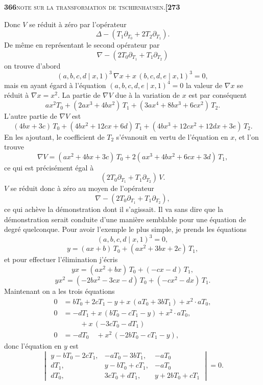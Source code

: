 \documentclass[11pt]{article}
\newcommand{\Cdel}{\mid}
\begin{document}
\newpage
\noindent\textbf{366}\hfill\textsc{note sur la transformation de tschirnhausen.}\hfill\textbf{[273}

\medskip

\noindent Donc $V$ se r\'eduit \`a z\'ero par l'op\'erateur
\[
\Delta - (T_1 \partial_{T_0} + 2 T_2 \partial_{T_1}).
\]
De m\^eme en repr\'esentant le second op\'erateur par
\[
\nabla - (2 T_0 \partial_{T_1} + T_1 \partial_{T_2})
\]
on trouve d'abord
\[
(a, b, c, d \Cdel x, 1)^3\, \nabla x + x\,(b, c, d, e \Cdel x, 1)^3 = 0,
\]
mais en ayant \'egard \`a l'\'equation $(a, b, c, d, e \Cdel x, 1)^4 = 0$ la valeur de $\nabla x$ se r\'eduit \`a $\nabla x = x^2$. La partie de $\nabla V$ due \`a la variation de $x$ est par cons\'equent
\[
a x^2 T_0 + (2 a x^3 + 4 b x^2)\, T_1 + (3 a x^4 + 8 b x^3 + 6 c x^2)\, T_2.
\]
L'autre partie de $\nabla V$ est
\[
(4 b x + 3 c)\, T_0 + (4 b x^2 + 12 c x + 6 d)\, T_1 + (4 b x^3 + 12 c x^2 + 12 d x + 3 e)\, T_2.
\]
En les ajoutant, le coefficient de $T_2$ s'\'evanouit en vertu de l'\'equation en $x$, et l'on trouve
\[
\nabla V = (a x^2 + 4 b x + 3 c)\, T_0 + 2(a x^3 + 4 b x^2 + 6 c x + 3 d)\, T_1,
\]
ce qui est pr\'ecis\'ement \'egal \`a
\[
(2 T_0 \partial_{T_1} + T_1 \partial_{T_2})\, V.
\]
$V$ se r\'eduit donc \`a z\'ero au moyen de l'op\'erateur
\[
\nabla - (2 T_0 \partial_{T_1} + T_1 \partial_{T_2}),
\]
ce qui ach\`eve la d\'emonstration dont il s'agissait. Il va sans dire que la d\'emonstration serait conduite d'une mani\`ere semblable pour une \'equation de degr\'e quelconque. Pour avoir l'exemple le plus simple, je prends les \'equations
\[
(a, b, c, d \Cdel x, 1)^3 = 0,
\]
\[
y = (a x + b)\, T_0 + (a x^2 + 3 b x + 2 c)\, T_1,
\]
et pour effectuer l'\'elimination j'\'ecris
\[
y x = (a x^2 + b x)\, T_0 + (-c x - d)\, T_1,
\]
\[
y x^2 = (-2 b x^2 - 3 c x - d)\, T_0 + (-c x^2 - d x)\, T_1.
\]
Maintenant on a les trois \'equations
\[
\begin{aligned}
0 &= b T_0 + 2 c T_1 - y + x\,(a T_0 + 3 b T_1) + x^2 \cdot a T_0,\\
0 &= -d T_1 + x\,(b T_0 - c T_1 - y) + x^2 \cdot a T_0,\\
&\phantom{=}\quad + x\,(-3 c T_0 - d T_1)\\
0 &= -d T_0 \quad + x^2\,(-2 b T_0 - c T_1 - y),
\end{aligned}
\]
donc l'\'equation en $y$ est
\[
\begin{vmatrix}
y - b T_0 - 2 c T_1, & -a T_0 - 3 b T_1, & -a T_0 \\
d T_1, & y - b T_0 + c T_1, & -a T_0 \\
d T_0, & 3 c T_0 + d T_1, & y + 2 b T_0 + c T_1
\end{vmatrix} = 0.
\]
\end{document}
